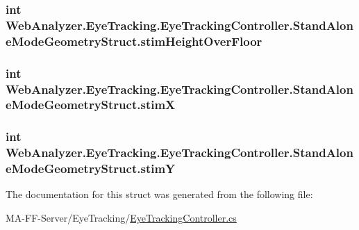 \subsubsection[{stim\+Height\+Over\+Floor}]{\setlength{\rightskip}{0pt plus 5cm}int Web\+Analyzer.\+Eye\+Tracking.\+Eye\+Tracking\+Controller.\+Stand\+Alone\+Mode\+Geometry\+Struct.\+stim\+Height\+Over\+Floor}\label{struct_web_analyzer_1_1_eye_tracking_1_1_eye_tracking_controller_1_1_stand_alone_mode_geometry_struct_a33965e997efc83dd71a23c08a80db5ee}
\hypertarget{struct_web_analyzer_1_1_eye_tracking_1_1_eye_tracking_controller_1_1_stand_alone_mode_geometry_struct_a64b395f1a76ba2f691c0ef01259168ba}{}
\subsubsection[{stim\+X}]{\setlength{\rightskip}{0pt plus 5cm}int Web\+Analyzer.\+Eye\+Tracking.\+Eye\+Tracking\+Controller.\+Stand\+Alone\+Mode\+Geometry\+Struct.\+stim\+X}\label{struct_web_analyzer_1_1_eye_tracking_1_1_eye_tracking_controller_1_1_stand_alone_mode_geometry_struct_a64b395f1a76ba2f691c0ef01259168ba}
\hypertarget{struct_web_analyzer_1_1_eye_tracking_1_1_eye_tracking_controller_1_1_stand_alone_mode_geometry_struct_ace1c440c06b7d36fc8b6fe6470bfc315}{}
\subsubsection[{stim\+Y}]{\setlength{\rightskip}{0pt plus 5cm}int Web\+Analyzer.\+Eye\+Tracking.\+Eye\+Tracking\+Controller.\+Stand\+Alone\+Mode\+Geometry\+Struct.\+stim\+Y}\label{struct_web_analyzer_1_1_eye_tracking_1_1_eye_tracking_controller_1_1_stand_alone_mode_geometry_struct_ace1c440c06b7d36fc8b6fe6470bfc315}


The documentation for this struct was generated from the following file\+:\begin{DoxyCompactItemize}
\item 
M\+A-\/\+F\+F-\/\+Server/\+Eye\+Tracking/\hyperlink{_eye_tracking_controller_8cs}{Eye\+Tracking\+Controller.\+cs}\end{DoxyCompactItemize}
